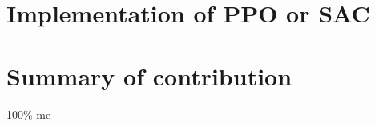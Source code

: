 \documentclass[a4pape, 11pt, english]{article}
\begin{document}
\section{Implementation of PPO or SAC}

\section{Summary of contribution}
100\% me


\end{document}
